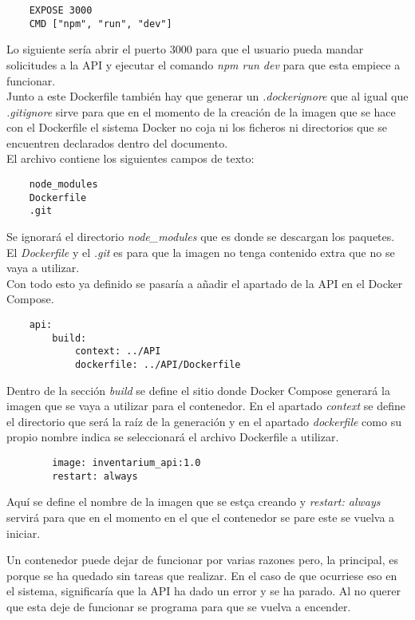 \begin{verbatim}
    EXPOSE 3000
    CMD ["npm", "run", "dev"]
\end{verbatim}
Lo siguiente sería abrir el puerto 3000 para que el usuario pueda mandar solicitudes a la API y ejecutar el comando \textit{npm run dev} para que esta empiece a funcionar.
\\Junto a este Dockerfile también hay que generar un \textit{.dockerignore} que al igual que \textit{.gitignore} sirve para que en el momento de la creación de la imagen que se hace con el Dockerfile el sistema Docker no coja ni los ficheros ni directorios que se encuentren declarados dentro del documento.
\\El archivo contiene los siguientes campos de texto:
\begin{verbatim}
    node_modules
    Dockerfile
    .git
\end{verbatim}
Se ignorará el directorio \textit{node\_modules} que es donde se descargan los paquetes. El \textit{Dockerfile} y el \textit{.git} es para que la imagen no tenga contenido extra que no se vaya a utilizar.
\vspace{\baselineskip}
\\Con todo esto ya definido se pasaría a añadir el apartado de la API en el Docker Compose.
\begin{verbatim}
    api:
        build:
            context: ../API
            dockerfile: ../API/Dockerfile
\end{verbatim}
Dentro de la sección \textit{build} se define el sitio donde Docker Compose generará la imagen que se vaya a utilizar para el contenedor. En el apartado \textit{context} se define el directorio que será la raíz de la generación y en el apartado \textit{dockerfile} como su propio nombre indica se seleccionará el archivo Dockerfile a utilizar.
\begin{verbatim}
        image: inventarium_api:1.0
        restart: always
\end{verbatim}
Aquí se define el nombre de la imagen que se estça creando y \textit{restart: always} servirá para que en el momento en el que el contenedor se pare este se vuelva a iniciar.
\begin{tcolorbox}
    [colback=green!5!white,colframe=green!75!black,fonttitle=\bfseries,title=¿Cuándo se para un contenedor?]
    Un contenedor puede dejar de funcionar por varias razones pero, la principal, es porque se ha quedado sin tareas que realizar. En el caso de que ocurriese eso en el sistema, significaría que la API ha dado un error y se ha parado. Al no querer que esta deje de funcionar se programa para que se vuelva a encender.
\end{tcolorbox}
